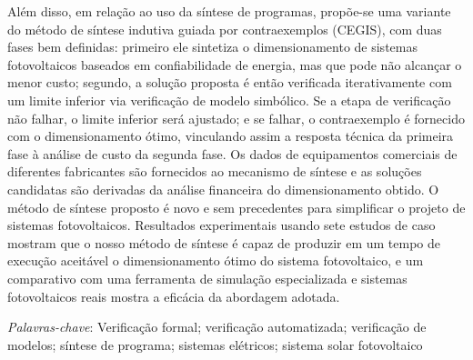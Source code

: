 Além disso, em relação ao uso da síntese de programas, propõe-se uma variante do método de síntese indutiva guiada por contraexemplos (CEGIS), com duas fases bem definidas: primeiro ele sintetiza o dimensionamento de sistemas fotovoltaicos baseados em confiabilidade de energia, mas que pode não alcançar o menor custo; segundo, a solução proposta é então verificada iterativamente com um limite inferior via verificação de modelo simbólico. Se a etapa de verificação não falhar, o limite inferior será ajustado; e se falhar, o contraexemplo é fornecido com o dimensionamento ótimo, vinculando assim a resposta técnica da primeira fase à análise de custo da segunda fase. Os dados de equipamentos comerciais de diferentes fabricantes são fornecidos ao mecanismo de síntese e as soluções candidatas são derivadas da análise financeira do dimensionamento obtido. O método de síntese proposto é novo e sem precedentes para simplificar o projeto de sistemas fotovoltaicos. Resultados experimentais usando sete estudos de caso mostram que o nosso método de síntese é capaz de produzir em um tempo de execução aceitável o dimensionamento ótimo do sistema fotovoltaico, e um comparativo com uma ferramenta de simulação especializada e sistemas fotovoltaicos reais mostra a eficácia da abordagem adotada.



\textit{Palavras-chave}: Verificação formal; verificação automatizada; verificação de modelos; síntese de programa; sistemas elétricos; sistema solar fotovoltaico